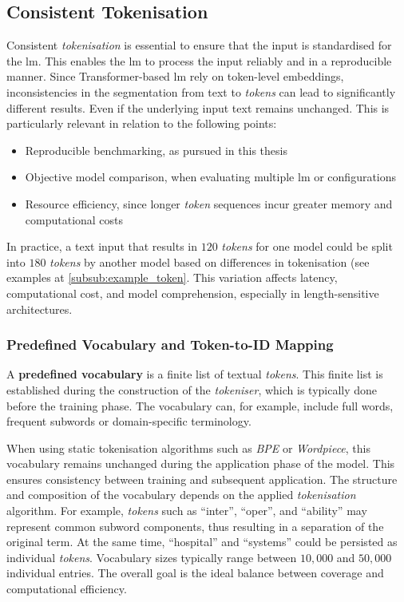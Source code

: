 \subsection{Consistent Tokenisation}
Consistent \textit{tokenisation} is essential to ensure that the input is standardised for the \ac{lm}.
This enables the \ac{lm} to process the input reliably and in a reproducible manner.
Since Transformer-based \ac{lm} rely on token-level embeddings, inconsistencies in the segmentation from text to \textit{tokens} can lead to significantly different results.
Even if the underlying input text remains unchanged.
%
This is particularly relevant in relation to the following points:
\begin{itemize}
    \item Reproducible benchmarking, as pursued in this thesis
    \item Objective model comparison, when evaluating multiple \ac{lm} or configurations
    \item Resource efficiency, since longer \textit{token} sequences incur greater memory and computational costs
\end{itemize}
%
In practice, a text input that results in $120$ \textit{tokens} for one model could be split into $180$ \textit{tokens} by another model based on differences in tokenisation (see examples at \cref{subsub:example_token}.
This variation affects latency, computational cost, and model comprehension, especially in length-sensitive architectures.
%
\subsubsection[Vocabulary and Mapping]{Predefined Vocabulary and Token-to-ID Mapping}\label{subsub:vocab_mapping}
%
\begin{definition}
    A \textbf{predefined vocabulary} is a finite list of textual \textit{tokens}.
    This finite list is established during the construction of the \textit{tokeniser}, which is typically done before the training phase.
    The vocabulary can, for example, include full words, frequent subwords or domain-specific terminology.
\end{definition}
%
When using static tokenisation algorithms such as \textit{BPE} or \textit{Wordpiece}, this vocabulary remains unchanged during the application phase of the model.
This ensures consistency between training and subsequent application.
%
The structure and composition of the vocabulary depends on the applied \textit{tokenisation} algorithm.
For example, \textit{tokens} such as \enquote{inter}, \enquote{oper}, and \enquote{ability} may represent common subword components, thus resulting in a separation of the original term.
At the same time, \enquote{hospital} and \enquote{systems} could be persisted as individual \textit{tokens}.
%
Vocabulary sizes typically range between $10,000$ and $50,000$ individual entries.
The overall goal is the ideal balance between coverage and computational efficiency.
%
%
